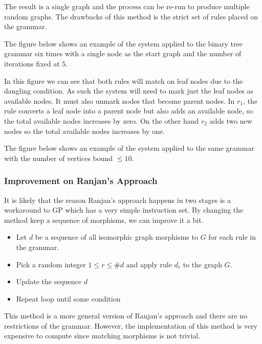   The result is a single graph and the process can be re-run to produce multiple random graphs. The drawbacks of this method is the strict set of rules placed on the grammar.

  

  The figure below shows an example of the system applied to the binary tree grammar six times with a single node as the start graph and the number of iterations fixed at $5$.

  

  In this figure we can see that both rules will match on leaf nodes due to the dangling condition. As such the system will need to mark just the leaf nodes as available nodes. It must also unmark nodes that become parent nodes. In $r_1$, the rule converts a leaf node into a parent node but also adds an available node, so the total available nodes increases by zero. On the other hand $r_2$ adds two new nodes so the total available nodes increases by one.

  The figure below shows an example of the system applied to the same grammar with the number of vertices bound $\leq 10$.
  


  \subsubsection{Improvement on Ranjan's Approach}

    It is likely that the reason Ranjan's approach happens in two stages is a workaround to GP which has a very simple instruction set. By changing the method keep a sequence of morphisms, we can improve it a bit.

    \begin{itemize}
    \item Let $d$ be a sequence of all isomorphic graph morphisms to $G$ for each rule in the grammar.
    \item Pick a random integer $1 \leq r \leq \#d$ and apply rule $d_r$ to the graph $G$.
    \item Update the sequence $d$
    \item Repeat loop until some condition
    \end{itemize}

    This method is a more general version of Ranjan's approach and there are no restrictions of the grammar. However, the implementation of this method is very expensive to compute since matching morphisms is not trivial.


